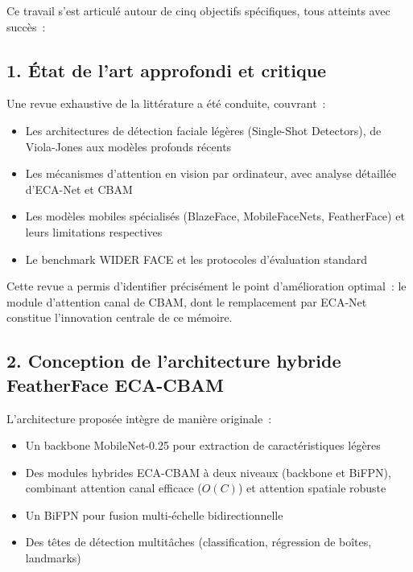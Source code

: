 \begin{onehalfspace}
\hspace{0.65 cm}Ce travail s'est articulé autour de cinq objectifs spécifiques, tous atteints avec succès~:

\subsection*{1. État de l'art approfondi et critique}

\hspace{0.65 cm}Une revue exhaustive de la littérature a été conduite, couvrant~:
\begin{itemize}
\item Les architectures de détection faciale légères (Single-Shot Detectors), de Viola-Jones \cite{ViolaJones2001} aux modèles profonds récents
\item Les mécanismes d'attention en vision par ordinateur, avec analyse détaillée d'ECA-Net \cite{Wang2020ECANet} et CBAM \cite{Woo2018CBAM}
\item Les modèles mobiles spécialisés (BlazeFace, MobileFaceNets, FeatherFace) et leurs limitations respectives
\item Le benchmark WIDER FACE \cite{Yang2016WIDERFACE} et les protocoles d'évaluation standard
\end{itemize}

\hspace{0.65 cm}Cette revue a permis d'identifier précisément le point d'amélioration optimal~: le module d'attention canal de CBAM, dont le remplacement par ECA-Net constitue l'innovation centrale de ce mémoire.

\subsection*{2. Conception de l'architecture hybride FeatherFace ECA-CBAM}

\hspace{0.65 cm}L'architecture proposée intègre de manière originale~:
\begin{itemize}
\item Un backbone MobileNet-0.25 pour extraction de caractéristiques légères
\item Des modules hybrides ECA-CBAM à deux niveaux (backbone et BiFPN), combinant attention canal efficace ($O(C)$) et attention spatiale robuste
\item Un BiFPN pour fusion multi-échelle bidirectionnelle \cite{Tan2020EfficientDet}
\item Des têtes de détection multitâches (classification, régression de boîtes, landmarks)
\end{itemize}


\end{onehalfspace}
